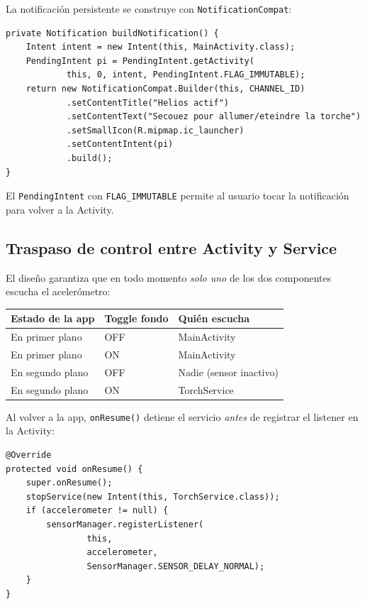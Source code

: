 \documentclass[12pt, a4paper]{article}
\begin{document}
La notificaci\'on persistente se construye con \texttt{NotificationCompat}:

\begin{lstlisting}[caption={Construcci\'on de la notificaci\'on --- \texttt{TorchService.java}}]
private Notification buildNotification() {
    Intent intent = new Intent(this, MainActivity.class);
    PendingIntent pi = PendingIntent.getActivity(
            this, 0, intent, PendingIntent.FLAG_IMMUTABLE);
    return new NotificationCompat.Builder(this, CHANNEL_ID)
            .setContentTitle("Helios actif")
            .setContentText("Secouez pour allumer/eteindre la torche")
            .setSmallIcon(R.mipmap.ic_launcher)
            .setContentIntent(pi)
            .build();
}
\end{lstlisting}

El \texttt{PendingIntent} con \texttt{FLAG\_IMMUTABLE} permite al usuario
tocar la notificaci\'on para volver a la Activity.

\subsection{Traspaso de control entre Activity y Service}

El dise\~no garantiza que en todo momento \emph{solo uno} de los dos
componentes escucha el aceler\'ometro:

\begin{center}
\begin{tabular}{@{} l l l @{}}
  \toprule
  \textbf{Estado de la app} & \textbf{Toggle fondo} & \textbf{Qui\'en escucha} \\
  \midrule
  En primer plano & OFF & MainActivity \\
  En primer plano & ON  & MainActivity \\
  En segundo plano & OFF & Nadie (sensor inactivo) \\
  En segundo plano & ON  & TorchService \\
  \bottomrule
\end{tabular}
\end{center}

Al volver a la app, \texttt{onResume()} detiene el servicio \emph{antes} de
registrar el listener en la Activity:

\begin{lstlisting}[caption={Traspaso de vuelta a la Activity --- \texttt{MainActivity.java}}]
@Override
protected void onResume() {
    super.onResume();
    stopService(new Intent(this, TorchService.class));
    if (accelerometer != null) {
        sensorManager.registerListener(
                this,
                accelerometer,
                SensorManager.SENSOR_DELAY_NORMAL);
    }
}
\end{lstlisting}
\end{document}
